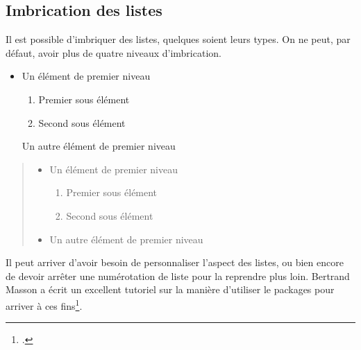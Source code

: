 \subsection{Imbrication des listes}

Il est possible d'imbriquer des listes, quelques soient leurs types. On ne peut, par défaut, avoir plus de quatre niveaux d'imbrication.

\begin{latexcode}
\begin{itemize}
	\item Un élément de premier niveau
	\begin{enumerate}
			\item Premier sous élément
			\item Second sous élément
	\end{enumerate}
	\iteem Un autre élément de premier niveau
\end{itemize}
\end{latexcode}
\begin{quotation}
\noindent\begin{itemize}
	\item Un élément de premier niveau
	\begin{enumerate}
			\item Premier sous élément
			\item Second sous élément
	\end{enumerate}
	\item Un autre élément de premier niveau
\end{itemize}
\end{quotation}

\begin{plusloins}
Il peut arriver d'avoir besoin de personnaliser l'aspect des listes, ou bien encore de devoir arrêter une numérotation de liste pour la reprendre plus loin. Bertrand Masson a écrit un excellent tutoriel sur la manière d'utiliser le packages  pour arriver à ces fins\footcite{bebert_liste}. 
\end{plusloins}
